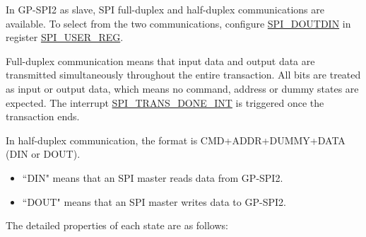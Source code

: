 \documentclass[main\_\_EN.tex]{subfiles}
\begin{document}
In GP-SPI2 as slave, SPI full-duplex and half-duplex communications are available. To select from the two communications, configure \hyperref[fielddesc:SPIDOUTDIN]{SPI\_DOUTDIN} in register \hyperref[regdesc:SPIUSERREG]{SPI\_USER\_REG}.

Full-duplex communication means that input data and output data are transmitted simultaneously throughout the entire transaction. All bits are treated as input or output data, which means no command, address or dummy states are expected. The interrupt \hyperref[int:SPITRANSDONEINT]{SPI\_TRANS\_DONE\_INT} is triggered once the transaction ends.

In half-duplex communication, the format is CMD+ADDR+DUMMY+DATA (DIN or DOUT).
\begin{itemize}
    \item ``DIN" means that an SPI master reads data from GP-SPI2.
    \item ``DOUT" means that an SPI master writes data to GP-SPI2.
\end{itemize}

The detailed properties of each state are as follows:
\end{document}
